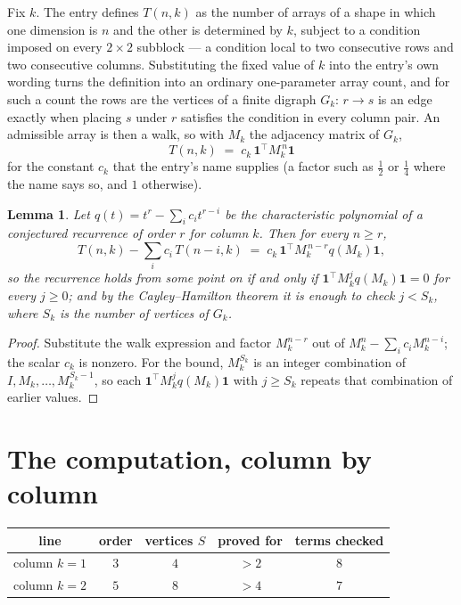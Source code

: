 \documentclass[11pt,a4paper]{article}
\theoremstyle{plain}
\newtheorem{lemma}[theorem]{Lemma}
\theoremstyle{definition}
\begin{document}
Fix $k$. The entry defines $T(n,k)$ as the number of arrays of a shape in which one dimension
is $n$ and the other is determined by $k$, subject to a condition imposed on every
$2\times2$ subblock --- a condition local to two consecutive rows and two consecutive columns.
Substituting the fixed value of $k$ into the entry's own wording turns the definition into an
ordinary one-parameter array count, and for such a count the rows are the vertices of a finite
digraph $G_k$: $r\to s$ is an edge exactly when placing $s$ under $r$ satisfies the condition
in every column pair. An admissible array is then a walk, so with $M_k$ the adjacency matrix
of $G_k$,
\[
T(n,k)\;=\;c_k\,\mathbf{1}^{\!\top}M_k^{\,n}\mathbf{1}
\]
for the constant $c_k$ that the entry's name supplies (a factor such as $\tfrac12$ or
$\tfrac14$ where the name says so, and $1$ otherwise).

\begin{lemma}\label{lem:crit}
Let $q(t)=t^{r}-\sum_i c_it^{r-i}$ be the characteristic polynomial of a conjectured
recurrence of order $r$ for column $k$. Then for every $n\ge r$,
\[
T(n,k)-\sum_i c_i\,T(n-i,k)\;=\;c_k\,\mathbf{1}^{\!\top}M_k^{\,n-r}q(M_k)\mathbf{1},
\]
so the recurrence holds from some point on if and only if
$\mathbf{1}^{\!\top}M_k^{j}q(M_k)\mathbf{1}=0$ for every $j\ge0$; and by the
Cayley--Hamilton theorem it is enough to check $j<S_k$, where $S_k$ is the number of vertices
of $G_k$.
\end{lemma}

\begin{proof}
Substitute the walk expression and factor $M_k^{n-r}$ out of $M_k^{n}-\sum_ic_iM_k^{n-i}$;
the scalar $c_k$ is nonzero. For the bound, $M_k^{S_k}$ is an integer combination of
$I,M_k,\dots,M_k^{S_k-1}$, so each $\mathbf{1}^{\!\top}M_k^{j}q(M_k)\mathbf{1}$ with
$j\ge S_k$ repeats that combination of earlier values.
\end{proof}

\section{The computation, column by column}

\begin{center}
\begin{tabular}{ccccc}
line & order & vertices $S$ & proved for & terms checked \\ \hline
column $k$$=1$ & $3$ & $4$ & $>2$ & $8$ \\
column $k$$=2$ & $5$ & $8$ & $>4$ & $7$ \\
\end{tabular}
\end{center}
\end{document}
